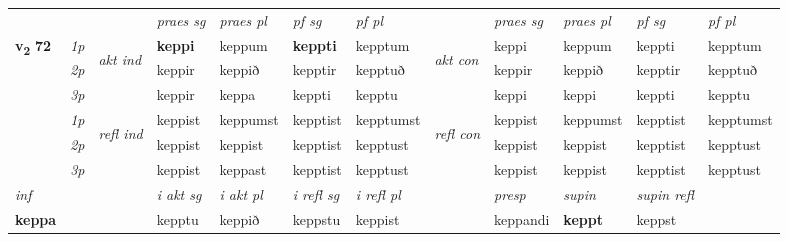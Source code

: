 \begin{longtable}[l]{X>{\footnotesize\itshape}llXXXXlXXXX}
\midrule

 & &   & \textit{praes sg}  & \textit{praes pl}    & \textit{ pf sg} & \textit{pf pl} & & \textit{praes sg}  & \textit{praes pl}    & \textit{pf sg} & \textit{pf pl }  \\ \cmidrule{4-7} \cmidrule{9-12}
 \multirow{2}{*}{{{\textbf{v{\textsubscript{2}}} \Large{\textbf{72}}}}}  & 1p & \multirow{3}{*}{\begin{turn}{90}\textit{akt ind}\end{turn}} & \textbf{keppi} & keppum & \textbf{keppti} & kepptum & \multirow{3}{*}{\begin{turn}{90}\textit{akt con}\end{turn}} &keppi & keppum & keppti & kepptum\\*
 & 2p &  &  keppir  & keppið & kepptir & kepptuð & & keppir & keppið & kepptir & kepptuð \\*
 & 3p &  & keppir & keppa & keppti & kepptu & & keppi & keppi& keppti & kepptu \\*
\cmidrule{4-7} \cmidrule{9-12}
 & 1p & \multirow{3}{*}{\begin{turn}{90}\textit{refl ind}\end{turn}}  & keppist & keppumst & kepptist & kepptumst & \multirow{3}{*}{\begin{turn}{90}\textit{refl con}\end{turn}}  &keppist & keppumst & kepptist & kepptumst \\*
 & 2p &  & keppist & keppist & kepptist & kepptust & &keppist & keppist & kepptist & kepptust \\*
 & 3p  & & keppist & keppast & kepptist & kepptust & & keppist & keppist& kepptist & kepptust \\*
\cmidrule{4-7} \cmidrule{9-12}

   {\textit{inf}} & &  & \textit{i akt sg} & \textit{i akt pl} & \textit{i refl sg} & \textit{i refl pl} && \textit{presp} & \textit{supin} & \textit{supin refl}  \\*
  {\textbf{keppa}} & && kepptu  & keppið & keppstu & keppist && keppandi &  \textbf{keppt} & keppst  \\*

\midrule


\end{longtable}
